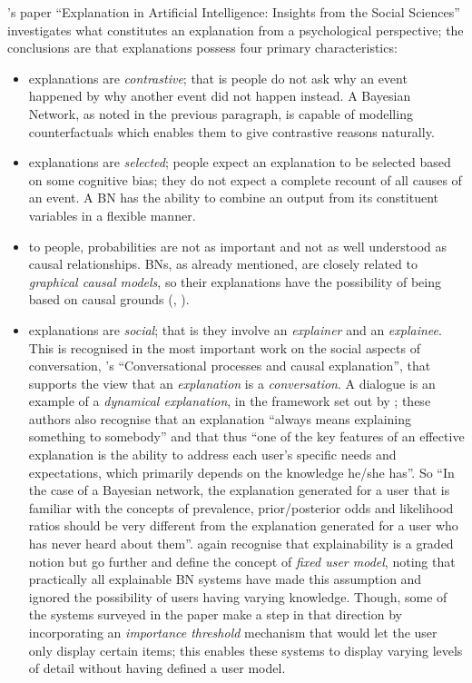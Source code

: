 \cite{miller2018explanation}'s paper \enquote{Explanation in Artificial Intelligence: Insights from the Social Sciences} investigates what constitutes an explanation from a psychological perspective; the conclusions are that explanations possess four primary characteristics:
\begin{itemize}
  \item explanations are \textit{contrastive}; that is people do not ask why an event happened by why another event did not happen instead.  
  A Bayesian Network, as noted in the previous paragraph, is capable of modelling counterfactuals which enables them to give contrastive reasons naturally.
  \item explanations are \textit{selected}; people expect an explanation to be selected based on some cognitive bias; they do not expect a complete recount of all causes of an event.
  A BN has the ability to combine an output from its constituent variables in a flexible manner. 
  \item to people, probabilities are not as important and not as well understood as causal relationships.
  BNs, as already mentioned, are closely related to \textit{graphical causal models}, so their explanations have the possibility of being based on causal grounds (\cite{Lipton2016}, \cite{rani2006empirical}).
  \item explanations are \textit{social}; that is they involve an \textit{explainer} and an \textit{explainee}.  
  This is recognised in the most important work on the social aspects of conversation, \cite{Hilton1990}'s \enquote{Conversational processes and causal explanation}, that supports the view that an \textit{explanation} is a \textit{conversation}. 
  A dialogue is an example of a \textit{dynamical explanation}, in the framework set out by \cite{lacave2002review}; these authors also recognise that an explanation \enquote{always means explaining something to somebody} and that thus \enquote{one of the key features of an effective explanation is the ability to address each user's specific needs and expectations, which primarily depends on the knowledge he/she has}.
  	  So \enquote{In the case of a Bayesian network, the explanation generated for a user that is familiar with the concepts of prevalence, prior/posterior odds and likelihood ratios should be very different from the explanation generated for a user who has never heard about them}.
  	  \cite{lacave2002review} again recognise that explainability is a graded notion but go further and define the concept of \textit{fixed user model}, noting that practically all explainable BN systems have made this assumption and ignored the possibility of users having varying knowledge.
  	  Though, some of the systems surveyed in the paper make a step in that direction by incorporating an \textit{importance threshold} mechanism that would let the user only display certain items; this enables these systems to display varying levels of detail without having defined a user model.
\end{itemize}

